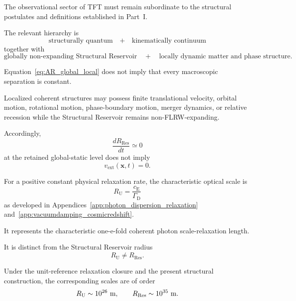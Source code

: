 The observational sector of TFT must remain subordinate to the structural
postulates and definitions established in Part~I.

The relevant hierarchy is
\begin{equation}
    \boxed{
    \text{structurally quantum}
    \quad+\quad
    \text{kinematically continuum}
    }
    \label{eq:AR_structural_kinematic}
\end{equation}
together with
\begin{equation}
    \boxed{
    \text{globally non-expanding Structural Reservoir}
    \quad+\quad
    \text{locally dynamic matter and phase structure}.
    }
    \label{eq:AR_global_local}
\end{equation}

Equation~\eqref{eq:AR_global_local} does not imply that every macroscopic
separation is constant.

Localized coherent structures may possess finite translational velocity,
orbital motion, rotational motion, phase-boundary motion, merger dynamics, or
relative recession while the Structural Reservoir remains non-FLRW-expanding.

Accordingly,
\begin{equation}
    \frac{dR_{\mathrm{Res}}}{dt}
    \simeq
    0
\end{equation}
at the retained global-static level does not imply
\begin{equation}
    v_{\mathrm{ext}}(\mathbf{x},t)=0.
\end{equation}

For a positive constant physical relaxation rate, the characteristic optical
scale is
\begin{equation}
    \boxed{
    R_{\mathrm U}
    =
    \frac{c_{\mathrm E}}{\Gamma_{\mathrm D}}
    }
    \label{eq:AR_RU}
\end{equation}
as developed in
Appendices~\ref{app:photon_dispersion_relaxation}
and~\ref{app:vacuumdamping_cosmicredshift}.

It represents the characteristic one-e-fold coherent photon
scale-relaxation length.

It is distinct from the Structural Reservoir radius
\begin{equation}
    \boxed{
    R_{\mathrm U}
    \neq
    R_{\mathrm{Res}}.
    }
    \label{eq:AR_RU_RRes}
\end{equation}

Under the unit-reference relaxation closure and the present structural
construction, the corresponding scales are of order
\begin{equation}
    R_{\mathrm U}
    \sim
    10^{26}\ {\rm m},
    \qquad
    R_{\mathrm{Res}}
    \sim
    10^{35}\ {\rm m}.
\end{equation}

